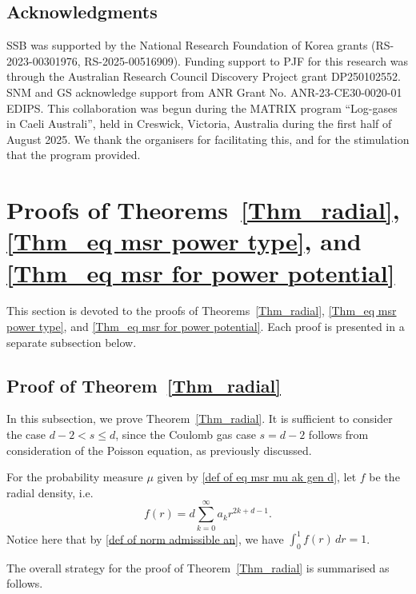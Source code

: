 \documentclass[10pt]{amsart}
\theoremstyle{plain}
\theoremstyle{remark}
\numberwithin{equation}{section}
\begin{document}
\medskip 


\subsection*{Acknowledgments} SSB was supported by the National Research Foundation of Korea grants (RS-2023-00301976, RS-2025-00516909).
Funding support to PJF for this research was through the Australian Research Council Discovery Project grant DP250102552. SNM and GS acknowledge support from ANR Grant No. ANR-23-CE30-0020-01 EDIPS. 
This collaboration was begun during the MATRIX program “Log-gases in Caeli Australi”, held in Creswick, Victoria, Australia during the first half of August 2025. We thank the organisers for facilitating this, and for the stimulation that the program provided.



 


\section{Proofs of Theorems~\ref{Thm_radial}, \ref{Thm_eq msr power type}, and \ref{Thm_eq msr for power potential}}\label{S2}

This section is devoted to the proofs of Theorems~\ref{Thm_radial}, \ref{Thm_eq msr power type}, and \ref{Thm_eq msr for power potential}. Each proof is presented in a separate subsection below.

\subsection{Proof of Theorem~\ref{Thm_radial}}

In this subsection, we prove Theorem~\ref{Thm_radial}.  It is sufficient to consider the case $d-2<s \le d$, since the Coulomb gas case $s=d-2$ follows from consideration of the Poisson equation, as previously discussed.

For the probability measure $\mu$ given by \eqref{def of eq msr mu ak gen d}, let $f$ be the radial density, i.e.  
\begin{equation} \label{def of radial density ak}
f(r) =  d \sum_{k=0}^\infty a_k r^{2k+d-1}. 
\end{equation}
Notice here that by \eqref{def of norm admissible an}, we have $\int_0^1 f(r)\,dr=1$. 

The overall strategy for the proof of Theorem~\ref{Thm_radial} is summarised as follows.
\end{document}
